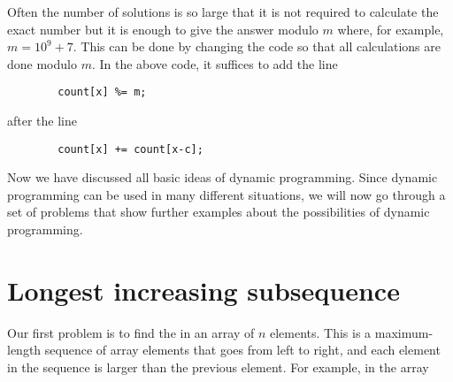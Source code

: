 Often the number of solutions is so large
that it is not required to calculate the exact number
but it is enough to give the answer modulo $m$
where, for example, $m=10^9+7$.
This can be done by changing the code so that
all calculations are done modulo $m$.
In the above code, it suffices to add the line
\begin{lstlisting}
        count[x] %= m;
\end{lstlisting}
after the line
\begin{lstlisting}
        count[x] += count[x-c];
\end{lstlisting}

Now we have discussed all basic
ideas of dynamic programming.
Since dynamic programming can be used
in many different situations,
we will now go through a set of problems
that show further examples about the
possibilities of dynamic programming.

\section{Longest increasing subsequence}


Our first problem is to find the
in an array of $n$ elements.
This is a maximum-length
sequence of array elements
that goes from left to right,
and each element in the sequence is larger
than the previous element.
For example, in the array

